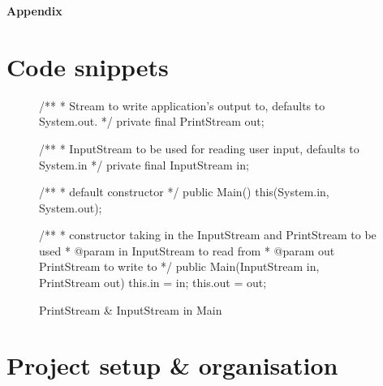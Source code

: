 \appendix
\setcounter{section}{0}
\pagebreak 
\clearpage
\thispagestyle{empty} %
\vspace*{9cm}
\begin{center}
{\bf \LARGE Appendix}
\end{center}
\vfill
\pagebreak







\pagebreak
\section{Code snippets}
\label{app:code-snippets}

\begin{figure}[H]
\centering
\begin{javacode}
/**
 * Stream to write application's output to, defaults to System.out.
 */
private final PrintStream out;

/**
 * InputStream to be used for reading user input, defaults to System.in
 */
private final InputStream in;

/**
 * default constructor
 */
public Main() {
    this(System.in, System.out);
}

/**
 * constructor taking in the InputStream and PrintStream to be used
 * @param in InputStream to read from
 * @param out PrintStream to write to
 */
public Main(InputStream in, PrintStream out) {
    this.in = in;
    this.out = out;
}
\end{javacode}
\caption{PrintStream \& InputStream in Main}
\label{code:snippet-1}
\end{figure}
\pagebreak
\section{Project setup \& organisation}

